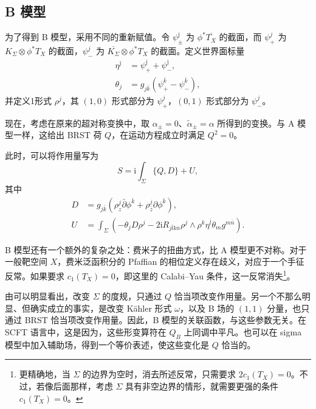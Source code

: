 \subsection{B 模型}\label{sec:3.4.2}

为了得到 B 模型，采用不同的重新赋值。令 $\psi_\pm^{\bar\jmath}$ 为 $\phi^*\overline{T_X}$ 的截面，而 $\psi_+^j$ 为 $K_\Sigma\otimes\phi^*T_X$ 的截面，$\psi_-^j$ 为 $\overline{K_\Sigma}\otimes\phi^*T_X$ 的截面。定义世界面标量
\begin{equation}\label{eq:3.123}
\begin{aligned}
\eta^{\bar\jmath}&=\psi_+^{\bar\jmath}+\psi_-^{\bar\jmath},\\
\theta_j&=g_{j\bar k}
\left(\psi_+^{\bar k}-\psi_-^{\bar k}\right),
\end{aligned}
\end{equation}
并定义1形式 $\rho^j$，其 $(1,0)$ 形式部分为 $\psi_+^j$，$(0,1)$ 形式部分为 $\psi_-^j$。

现在，考虑在原来的超对称变换中，取 $\alpha_\pm=0$、$\widetilde\alpha_\pm=\alpha$ 所得到的变换。与 A 模型一样，这给出 BRST 荷 $Q$，在运动方程成立时满足 $Q^2=0$。

此时，可以将作用量写为
\begin{equation}\label{eq:3.124}
S=\mathrm{i}\int_\Sigma\{Q,D\}+U,
\end{equation}
其中
\begin{equation}\label{eq:3.125}
\begin{aligned}
D&=g_{j\bar k}
\left(\rho_z^j\bar\partial\phi^{\bar k}
+\rho_{\bar z}^j\partial\phi^{\bar k}\right),\\
U&=\int_\Sigma\left(
-\theta_jD\rho^j
-2\mathrm{i}R_{j\bar l k\bar n}\rho^j\wedge\rho^k
\eta^{\bar l}\theta_mg^{m\bar n}\right).
\end{aligned}
\end{equation}

B 模型还有一个额外的复杂之处：费米子的扭曲方式，比 A 模型更不对称。对于一般靶空间 $X$，费米泛函积分的 Pfaffian 的相位定义存在歧义，对应于一个手征反常。如果要求 $c_1(T_X)=0$，即这里的 Calabi--Yau 条件，这一反常消失\footnote{更精确地，当 $\Sigma$ 的边界为空时，消去所述反常，只需要求 $2c_1(T_X)=0$。不过，若像后面那样，考虑 $\Sigma$ 具有非空边界的情形，就需要更强的条件 $c_1(T_X)=0$。}。

由可以明显看出，改变 $\Sigma$ 的度规，只通过 $Q$ 恰当项改变作用量。另一个不那么明显、但确实成立的事实，是改变 K\"ahler 形式 $\omega$，以及 B 场的 $(1,1)$ 分量，也只通过 BRST 恰当项改变作用量。因此，B 模型的关联函数，与这些参数无关。在 SCFT 语言中，这是因为，这些形变算符在 $Q_B$ 上同调中平凡。也可以在 sigma 模型中加入辅助场，得到一个等价表述，使这些变化是 $Q$ 恰当的。

